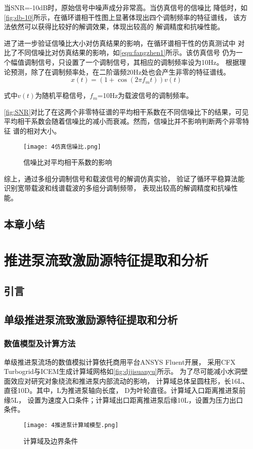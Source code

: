 当SNR=-10dB时，原始信号中噪声成分非常高。当仿真信号的信噪比
降低时，如\autoref{fig:db-10}所示，在循环谱相干性图上显著体现出四个调制频率的特征谱线，
该方法依然可以获得比较好的解调效果，体现出较高的
解调精度和抗噪性能。

进了进一步验证信嗓比大小对仿真结果的影响，在循环谱相干性的仿真测试中
对比了不同信噪比对仿真结果的影响，如\autoref{equ:fangzhen1}所示。该仿真信号
仍为一个幅值调制信号，只设置了一个调制信号，其相应的调制频率设为10Hz。
根据理论预测，除了在调制频率处，在二阶谐频20Hz处也会产生非零的特征谱线。
\begin{equation}
    \label{equ:fangzhen1}
    x\left ( t \right ) =\left ( 1+\cos \left ( 2\pi f_mt \right )  \right ) v\left ( t \right ) 
\end{equation}

式中$v\left ( t \right )$为随机平稳信号，$f_m$=10Hz为载波信号的调制频率。

\autoref{fig:SNR}对比了在这两个非零特征谱的平均相干系数在不同信噪比下的结果，可见
平均相干系数会随着信噪比的减小而衰减。然而，信噪比并不影响判断两个非零特征
谱的相对大小。

\begin{figure}[htbp]
    \centering
    \texttt{[image: 4仿真信噪比.png]}
    \caption{\label{fig:SNR}信噪比对平均相干系数的影响
    }
\end{figure}

综上，通过多组分调制信号和载波信号的解调仿真实验，
验证了循环平稳算法能识别宽带载波和线谱载波的多组分调制频带，
表现出较高的解调精度和抗噪性能。
\section{本章小结}


\chapter{推进泵流致激励源特征提取和分析}
\section{引言}

\section{单级推进泵流致激励源特征提取和分析}
\subsection{数值模型及计算方法}
单级推进泵流场的数值模拟计算依托商用平台ANSYS Fluent开展，
采用CFX Turbogrid与ICEM生成计算域网格如\autoref{fig:djjisuanyu}所示。
为了尽可能减小水洞壁面效应对研究对象绕流和推进泵内部流动的影响，
计算域总体呈圆柱形，长16L、直径10D。其中，L为推进泵轴向长度，
D为叶轮直径。计算域入口距离推进泵前缘5L，
设置为速度入口条件；计算域出口距离推进泵后缘10L，设置为压力出口条件。
\begin{figure}[htbp]
    \centering
    \texttt{[image: 4推进泵计算域模型.png]}
    \caption{\label{fig:djjisuanyu}计算域及边界条件}
\end{figure}

